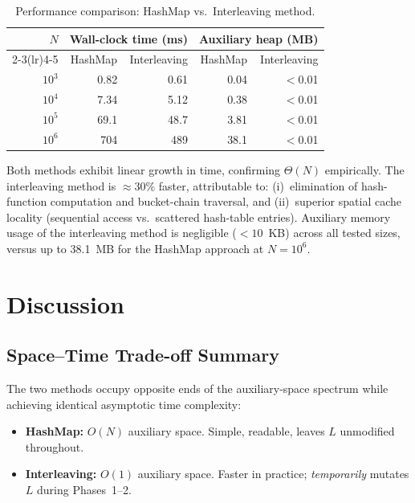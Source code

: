 \documentclass[10pt,journal,compsoc]{IEEEtran}
\begin{document}
\begin{table}[htbp]
\centering
\caption{Performance comparison: HashMap vs.\ Interleaving method.}
\label{tab:perf}
\begin{tabular}{rrrrr}
\toprule
$N$ & \multicolumn{2}{c}{Wall-clock time (ms)} & \multicolumn{2}{c}{Auxiliary heap (MB)} \\
\cmidrule(lr){2-3}\cmidrule(lr){4-5}
& HashMap & Interleaving & HashMap & Interleaving \\
\midrule
$10^3$ & 0.82  & 0.61  & 0.04  & $\mathbf{<}$0.01 \\
$10^4$ & 7.34  & 5.12  & 0.38  & $\mathbf{<}$0.01 \\
$10^5$ & 69.1  & 48.7  & 3.81  & $\mathbf{<}$0.01 \\
$10^6$ & 704   & 489   & 38.1  & $\mathbf{<}$0.01 \\
\bottomrule
\end{tabular}
\end{table}

Both methods exhibit linear growth in time, confirming $\Theta(N)$ empirically. The interleaving method is $\approx 30\%$ faster, attributable to: (i)~elimination of hash-function computation and bucket-chain traversal, and (ii)~superior spatial cache locality (sequential access vs.\ scattered hash-table entries). Auxiliary memory usage of the interleaving method is negligible ($<10$~KB) across all tested sizes, versus up to 38.1~MB for the HashMap approach at $N = 10^6$.

\section{Discussion}
\label{sec:discussion}

\subsection{Space--Time Trade-off Summary}

The two methods occupy opposite ends of the auxiliary-space spectrum while achieving identical asymptotic time complexity:
\begin{itemize}
  \item \textbf{HashMap:} $O(N)$ auxiliary space. Simple, readable, leaves $L$ unmodified throughout.
  \item \textbf{Interleaving:} $O(1)$ auxiliary space. Faster in practice; \textit{temporarily} mutates $L$ during Phases~1--2.
\end{itemize}
\end{document}

